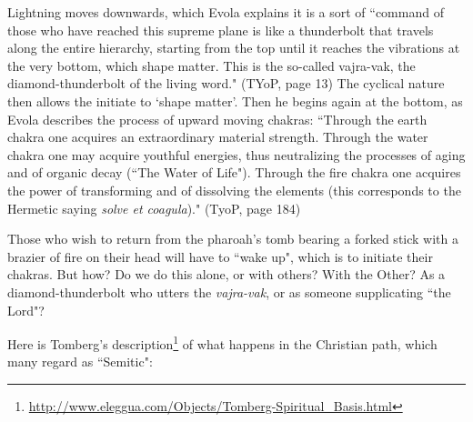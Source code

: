 \begin{quotex}
Lightning moves downwards, which Evola explains it is a sort of ``command of those who have reached this supreme plane is like a thunderbolt that travels along the entire hierarchy, starting from the top until it reaches the vibrations at the very bottom, which shape matter. This is the so-called vajra-vak, the diamond-thunderbolt of the living word." (TYoP, page 13) The cyclical nature then allows the initiate to `shape matter'. Then he begins again at the bottom, as Evola describes the process of upward moving chakras: ``Through the earth chakra one acquires an extraordinary material strength. Through the water chakra one may acquire youthful energies, thus neutralizing the processes of aging and of organic decay (``The Water of Life"). Through the fire chakra one acquires the power of transforming and of dissolving the elements (this corresponds to the Hermetic saying \textit{solve et coagula})." (TyoP, page 184)


\end{quotex}
Those who wish to return from the pharoah's tomb bearing a forked stick with a brazier of fire on their head will have to ``wake up", which is to initiate their chakras. But how? Do we do this alone, or with others? With the Other? As a diamond-thunderbolt who utters the \emph{vajra-vak}, or as someone supplicating ``the Lord"?

Here is Tomberg's description\footnote{\url{http://www.eleggua.com/Objects/Tomberg-Spiritual_Basis.html}} of what happens in the Christian path, which many regard as ``Semitic":

